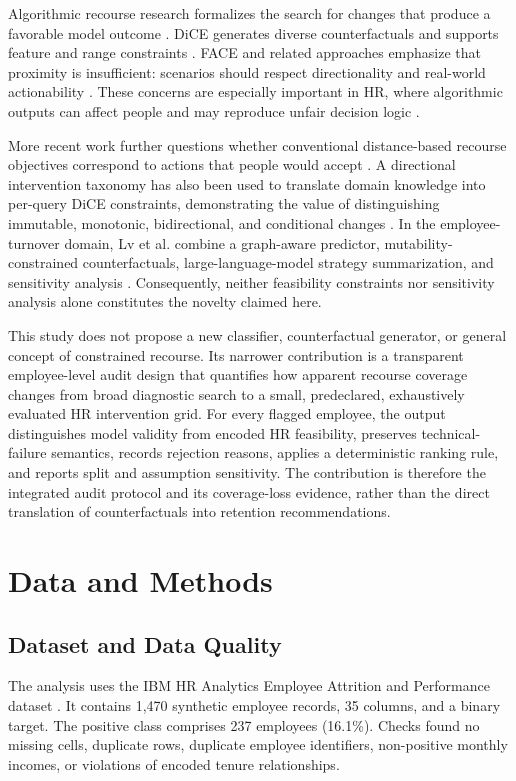 \documentclass[11pt]{article}
\begin{document}
Algorithmic recourse research formalizes the search for changes that produce a favorable model outcome \cite{ustun2019,karimi2022}. DiCE generates diverse counterfactuals and supports feature and range constraints \cite{mothilal2020}. FACE and related approaches emphasize that proximity is insufficient: scenarios should respect directionality and real-world actionability \cite{poyiadzi2020}. These concerns are especially important in HR, where algorithmic outputs can affect people and may reproduce unfair decision logic \cite{kochling2020,tambe2019}.

More recent work further questions whether conventional distance-based recourse objectives correspond to actions that people would accept \cite{tominaga2024}. A directional intervention taxonomy has also been used to translate domain knowledge into per-query DiCE constraints, demonstrating the value of distinguishing immutable, monotonic, bidirectional, and conditional changes \cite{thieu2026}. In the employee-turnover domain, Lv et al. combine a graph-aware predictor, mutability-constrained counterfactuals, large-language-model strategy summarization, and sensitivity analysis \cite{lv2026}. Consequently, neither feasibility constraints nor sensitivity analysis alone constitutes the novelty claimed here.

This study does not propose a new classifier, counterfactual generator, or general concept of constrained recourse. Its narrower contribution is a transparent employee-level audit design that quantifies how apparent recourse coverage changes from broad diagnostic search to a small, predeclared, exhaustively evaluated HR intervention grid. For every flagged employee, the output distinguishes model validity from encoded HR feasibility, preserves technical-failure semantics, records rejection reasons, applies a deterministic ranking rule, and reports split and assumption sensitivity. The contribution is therefore the integrated audit protocol and its coverage-loss evidence, rather than the direct translation of counterfactuals into retention recommendations.

\section{Data and Methods}
\subsection{Dataset and Data Quality}
The analysis uses the IBM HR Analytics Employee Attrition and Performance dataset \cite{ibmdata}. It contains 1,470 synthetic employee records, 35 columns, and a binary target. The positive class comprises 237 employees (16.1\%). Checks found no missing cells, duplicate rows, duplicate employee identifiers, non-positive monthly incomes, or violations of encoded tenure relationships.
\end{document}
